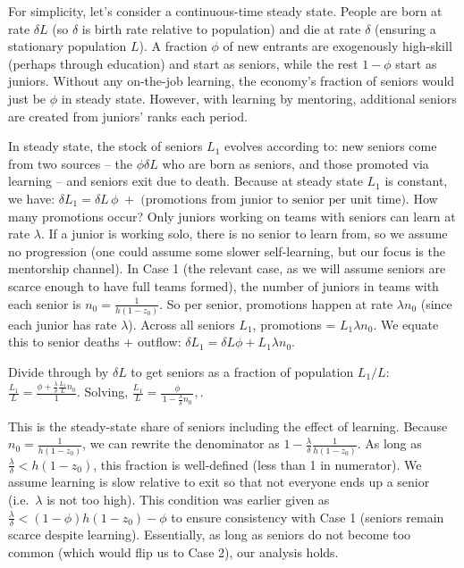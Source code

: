 \documentclass[12pt]{article}
\begin{document}
For simplicity, let's consider a continuous-time steady state. People
are born at rate \(\delta L\) (so \(\delta\) is birth rate relative to
population) and die at rate \(\delta\) (ensuring a stationary population
\(L\)). A fraction \(\phi\) of new entrants are {exogenously}
high-skill (perhaps through education) and start as seniors, while the
rest \(1-\phi\) start as juniors. Without any on-the-job learning, the
economy's fraction of seniors would just be \(\phi\) in steady state.
However, {with learning by mentoring, additional seniors are
created from juniors' ranks} each period.

In steady state, the {stock of seniors \(L_1\)} evolves according
to: new seniors come from two sources -- the \(\phi \delta L\) who are
born as seniors, and those promoted via learning -- and seniors exit due
to death. Because at steady state \(L_1\) is constant, we have:
\(\delta L_1 = \delta L\,\phi \;+\; \text{(promotions from junior to senior per unit time)}.\)
How many promotions occur? Only juniors {working on teams} with
seniors can learn at rate \(\lambda\). If a junior is working solo,
there is no senior to learn from, so we assume no progression (one could
assume some slower self-learning, but our focus is the mentorship
channel). In Case 1 (the relevant case, as we will assume seniors are
scarce enough to have full teams formed), the number of juniors in teams
with each senior is \(n_0 = \frac{1}{h(1-z_0)}\). So per senior,
promotions happen at rate \(\lambda n_0\) (since each junior has rate
\(\lambda\)). Across all seniors \(L_1\), promotions =
\(L_1 \lambda n_0\). We equate this to senior deaths + outflow:
\(\delta L_1 = \delta L \phi + L_1 \lambda n_0.\)

Divide through by \(\delta L\) to get seniors as a fraction of
population \(L_1/L\):
\(\frac{L_1}{L} = \frac{\phi + \frac{\lambda}{\delta} \frac{L_1}{L} n_0}{1}.\)
Solving, $ \frac{L_1}{L} =
\frac{\phi}{\,1 - \frac{\lambda}{\delta} n_0\,},. \tag{10}$

This is the steady-state share of seniors including the effect of
learning. Because \(n_0 = \frac{1}{h(1-z_0)}\), we can rewrite the
denominator as \(1 - \frac{\lambda}{\delta}\frac{1}{h(1-z_0)}\). As long
as \(\frac{\lambda}{\delta} < h(1-z_0)\), this fraction is well-defined
(less than 1 in numerator). We assume {learning is slow relative
to exit} so that not everyone ends up a senior (i.e.~\(\lambda\) is not
too high). This condition was earlier given as
\(\frac{\lambda}{\delta} < (1-\phi)h(1-z_0) - \phi\) to ensure
consistency with Case 1 (seniors remain scarce despite learning).
Essentially, as long as seniors do not become too common (which would
flip us to Case 2), our analysis holds.
\end{document}

